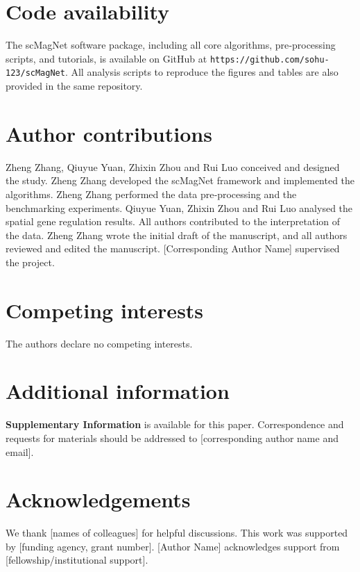 \documentclass[10pt,a4paper]{article}
\begin{document}

\section*{Code availability}
The scMagNet software package, including all core algorithms, pre‑processing scripts, and tutorials, is available on GitHub at 
\texttt{https://github.com/sohu-123/scMagNet}. All analysis scripts to reproduce the figures and tables are also provided in the same repository.

\section*{Author contributions}
Zheng Zhang, Qiuyue Yuan, Zhixin Zhou and Rui Luo conceived and designed the study. Zheng Zhang developed the scMagNet framework and implemented the algorithms. Zheng Zhang performed the data pre‑processing and the benchmarking experiments. Qiuyue Yuan, Zhixin Zhou and Rui Luo analysed the spatial gene regulation results. All authors contributed to the interpretation of the data. Zheng Zhang wrote the initial draft of the manuscript, and all authors reviewed and edited the manuscript. [Corresponding Author Name] supervised the project.

\section*{Competing interests}
The authors declare no competing interests.

\section*{Additional information}
\textbf{Supplementary Information} is available for this paper. Correspondence and requests for materials should be addressed to [corresponding author name and email].

\section*{Acknowledgements}
We thank [names of colleagues] for helpful discussions. This work was supported by [funding agency, grant number]. [Author Name] acknowledges support from [fellowship/institutional support].
\end{document}
